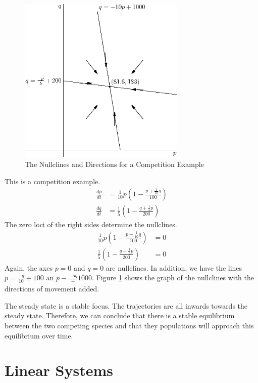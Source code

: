 \documentclass[fleqn,letterpaper]{report}
\begin{document}
\begin{figure}[t]
\centering
\includegraphics[width=8cm]{figure27.eps}
\caption{The Nullclines and Directions for a Competition
Example}
\label{figure-competition-example}
\end{figure}

\begin{example}
This is a competition example.
\begin{align*}
\frac{dp}{dt} & = \frac{1}{10} p\left(1- \frac{p +
\frac{1}{10}q}{100} \right) \\
\frac{dq}{dt} & = \frac{1}{5} \left(1- \frac{q + \frac{1}{5}
p}{200} \right)
\end{align*}
The zero loci of the right sides determine the nullclines.
\begin{align*}
\frac{1}{10} p\left(1- \frac{p +
\frac{1}{10}q}{100} \right) & = 0 \\
\frac{1}{5} \left(1- \frac{q + \frac{1}{5}
p}{200} \right) & = 0 
\end{align*}
Again, the axes $p=0$ and $q=0$ are nullclines. In addition,
we have the lines $p = \frac{-q}{10} + 100$ an $p - \frac{-5q}
+ 1000$. Figure \ref{figure-competition-example} shows the graph of
the nullclines with the directions of movement added.

The steady state is a stable focus. The trajectories are all
inwards towards the steady state. Therefore, we can conclude
that there is a stable equilibrium between the two competing
species and that they populations will approach this
equilibrium over time.
\end{example}

\section{Linear Systems}
\label{linear-systems}
\end{document}
